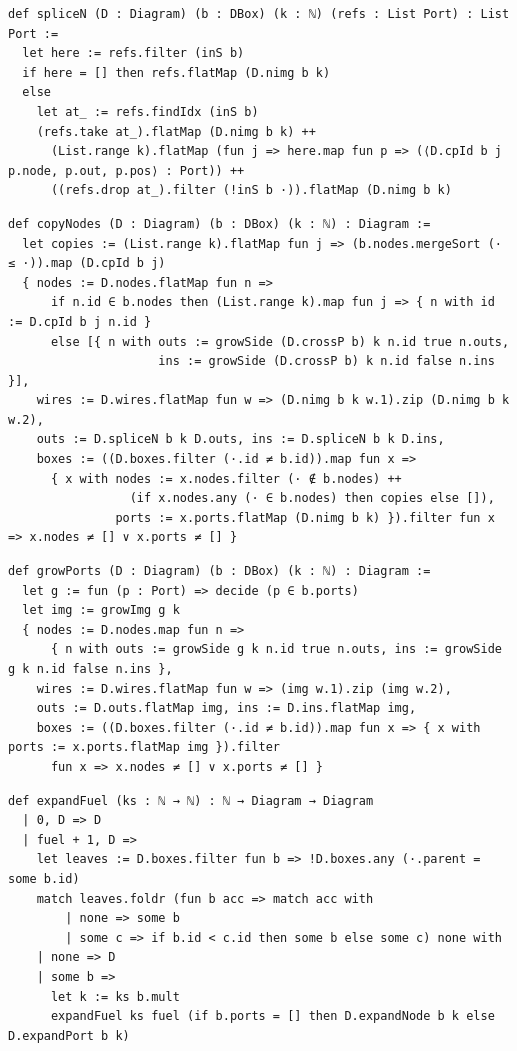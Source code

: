 \begin{lstlisting}[style=leancore]
def spliceN (D : Diagram) (b : DBox) (k : ℕ) (refs : List Port) : List Port :=
  let here := refs.filter (inS b)
  if here = [] then refs.flatMap (D.nimg b k)
  else
    let at_ := refs.findIdx (inS b)
    (refs.take at_).flatMap (D.nimg b k) ++
      (List.range k).flatMap (fun j => here.map fun p => (⟨D.cpId b j p.node, p.out, p.pos⟩ : Port)) ++
      ((refs.drop at_).filter (!inS b ·)).flatMap (D.nimg b k)
\end{lstlisting}
\begin{lstlisting}[style=leancore]
def copyNodes (D : Diagram) (b : DBox) (k : ℕ) : Diagram :=
  let copies := (List.range k).flatMap fun j => (b.nodes.mergeSort (· ≤ ·)).map (D.cpId b j)
  { nodes := D.nodes.flatMap fun n =>
      if n.id ∈ b.nodes then (List.range k).map fun j => { n with id := D.cpId b j n.id }
      else [{ n with outs := growSide (D.crossP b) k n.id true n.outs,
                     ins := growSide (D.crossP b) k n.id false n.ins }],
    wires := D.wires.flatMap fun w => (D.nimg b k w.1).zip (D.nimg b k w.2),
    outs := D.spliceN b k D.outs, ins := D.spliceN b k D.ins,
    boxes := ((D.boxes.filter (·.id ≠ b.id)).map fun x =>
      { x with nodes := x.nodes.filter (· ∉ b.nodes) ++
                 (if x.nodes.any (· ∈ b.nodes) then copies else []),
               ports := x.ports.flatMap (D.nimg b k) }).filter fun x => x.nodes ≠ [] ∨ x.ports ≠ [] }
\end{lstlisting}
\begin{lstlisting}[style=leancore]
def growPorts (D : Diagram) (b : DBox) (k : ℕ) : Diagram :=
  let g := fun (p : Port) => decide (p ∈ b.ports)
  let img := growImg g k
  { nodes := D.nodes.map fun n =>
      { n with outs := growSide g k n.id true n.outs, ins := growSide g k n.id false n.ins },
    wires := D.wires.flatMap fun w => (img w.1).zip (img w.2),
    outs := D.outs.flatMap img, ins := D.ins.flatMap img,
    boxes := ((D.boxes.filter (·.id ≠ b.id)).map fun x => { x with ports := x.ports.flatMap img }).filter
      fun x => x.nodes ≠ [] ∨ x.ports ≠ [] }
\end{lstlisting}
\begin{lstlisting}[style=leancore]
def expandFuel (ks : ℕ → ℕ) : ℕ → Diagram → Diagram
  | 0, D => D
  | fuel + 1, D =>
    let leaves := D.boxes.filter fun b => !D.boxes.any (·.parent = some b.id)
    match leaves.foldr (fun b acc => match acc with
        | none => some b
        | some c => if b.id < c.id then some b else some c) none with
    | none => D
    | some b =>
      let k := ks b.mult
      expandFuel ks fuel (if b.ports = [] then D.expandNode b k else D.expandPort b k)
\end{lstlisting}

